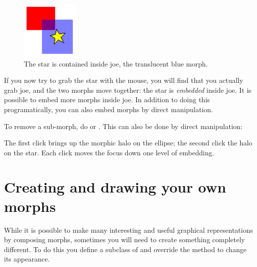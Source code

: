 \documentclass[a4paper,10pt,twoside]{book}
\begin{document}
\begin{figure}[ht]
	\centerline{\includegraphics{joeStar}}
	\caption{The star is contained inside joe, the translucent blue morph.
		\label{fig:joeStar}}
\end{figure}

If you now try to grab the star with the mouse, you will find that you actually grab joe, and the two morphs move together: the star is \emph{embedded} inside joe.
It is possible to embed more morphs inside joe.  
In addition to doing this programatically, you can also embed morphs by direct manipulation.


To remove a sub-morph, do    or  .  This can also be done by direct manipulation:


\noindent
The first click brings up the morphic halo on the ellipse; the second click the halo on the star.   Each click moves the focus down one level of embedding.


\section{Creating and drawing your own morphs}

While it is possible to make many interesting and useful graphical representations by composing morphs, sometimes you will need to create something completely different.
To do this you define a subclass of  and override the  method to change its appearance.
\end{document}
